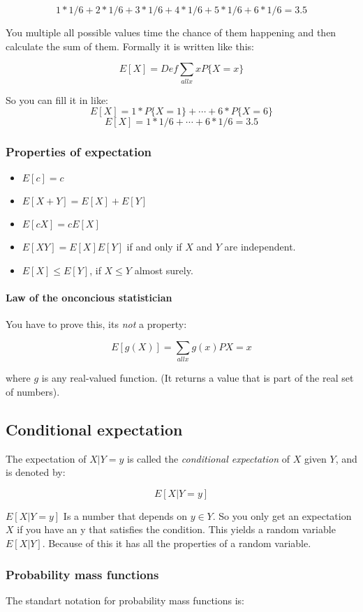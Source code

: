\documentclass{article}
\begin{document}
\[1 * 1/6 + 2 * 1/6 + 3 * 1/6 + 4 * 1/6 + 5 * 1/6 + 6 * 1/6 = 3.5\]

You multiple all possible values time the chance of them happening and then
calculate the sum of them. Formally it is written like this:

\[ E[X]=Def \sum_{all x} xP\{X=x\} \]

So you can fill it in like:
\[E[X]= 1 * P\{X=1\} + \cdots + 6 *P\{X=6\}\]
\[E[X]= 1 * 1/6 + \cdots + 6 *1/6 = 3.5\]

\subsubsection{Properties of expectation}

\begin{itemize}
	\item $E[c] = c$
	\item $E[X+Y] = E[X] + E[Y]$
	\item $E[cX] = cE[X]$
	\item $E[XY] = E[X]E[Y]$ if and only if $X$ and $Y$ are independent.
	\item $E[X] \le E[Y]$, if $X \le Y$ almost surely.
\end{itemize}

\paragraph{Law of the onconcious statistician}
You have to prove this, its \emph{not} a property:

\[E[g(X)]=\sum_{all x} g(x)P{X=x}\]

where $g$ is any real-valued function. (It returns a value that is part
of the real set of numbers).

\subsection{Conditional expectation}
The expectation of $X | Y = y$ is called the \emph{conditional expectation}
of $X$ given $Y$, and is denoted by:

\[E[X|Y=y]\]

$E[X|Y=y]$ Is a number that depends on $y \in Y$. So you only get an
expectation $X$ if you have an y that satisfies the condition.
This yields a random variable $E[X|Y]$. Because of this it has all the
properties of a random variable.

\subsubsection{Probability mass functions}
The standart notation for probability mass functions is:
\end{document}
